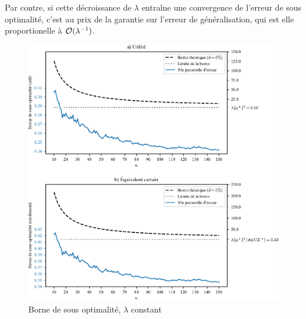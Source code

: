 Par contre, si cette décroissance de $\lambda$ entraîne une convergence de l'erreur de sous
optimalité, c'est au prix de la garantie sur l'erreur de généralisation, qui est elle
proportionelle à $\mathcal O(\lambda^{-1})$.


\newpage

\begin{figure}[h!]
  \centering
  \includegraphics[width=1\textwidth]{../../experiments/fig/bound_errso.pdf}
  \caption{Borne de sous optimalité, $\lambda$ constant}
  \label{fig_bound_errso}
\end{figure}

